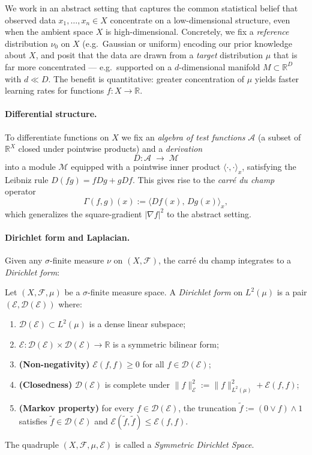 \documentclass{article}
\begin{document}
We work in an abstract setting that captures the common statistical belief
that observed data $x_1,\ldots,x_n \in X$ concentrate on a low-dimensional
structure, even when the ambient space $X$ is high-dimensional.
Concretely, we fix a \emph{reference} distribution $\nu_0$ on $X$
(e.g.\ Gaussian or uniform) encoding our prior knowledge about $X$,
and posit that the data are drawn from a \emph{target} distribution $\mu$
that is far more concentrated — e.g.\ supported on a $d$-dimensional
manifold $M \subset \mathbb{R}^D$ with $d \ll D$.
The benefit is quantitative: greater concentration of $\mu$ yields faster
learning rates for functions $f: X \to \mathbb{R}$.

\paragraph{Differential structure.}
To differentiate functions on $X$ we fix an \emph{algebra of test functions}
$\mathcal{A}$ (a subset of $\mathbb{R}^X$ closed under pointwise products) and a
\emph{derivation}
\[
	D : \mathcal{A} \;\longrightarrow\; \mathcal{M}
\]
into a module $\mathcal{M}$ equipped with a pointwise inner product
$\langle\cdot,\cdot\rangle_x$, satisfying the Leibniz rule
$D(fg) = fDg + gDf$.
This gives rise to the \emph{carré du champ} operator
\[
	\Gamma(f,g)(x) := \langle Df(x),\, Dg(x)\rangle_x,
\]
which generalizes the square-gradient $|\nabla f|^2$ to the abstract setting.

\paragraph{Dirichlet form and Laplacian.}
Given any $\sigma$-finite measure $\nu$ on $(X,\mathcal{F})$, the carré du
champ integrates to a \emph{Dirichlet form}:

\begin{definition}
	Let $(X,\mathcal{F},\mu)$ be a $\sigma$-finite measure space.
	A \emph{Dirichlet form} on $L^2(\mu)$ is a pair
	$(\mathcal{E},\mathcal{D}(\mathcal{E}))$ where:
	\begin{enumerate}
		\item $\mathcal{D}(\mathcal{E})\subset L^2(\mu)$ is a dense linear subspace;
		\item $\mathcal{E}:\mathcal{D}(\mathcal{E})\times\mathcal{D}(\mathcal{E})\to\mathbb{R}$
		      is a symmetric bilinear form;
		\item \textbf{(Non-negativity)} $\mathcal{E}(f,f)\ge 0$ for all
		      $f\in\mathcal{D}(\mathcal{E})$;
		\item \textbf{(Closedness)} $\mathcal{D}(\mathcal{E})$ is complete under
		      $\|f\|_{\mathcal{E}}^2 := \|f\|_{L^2(\mu)}^2 + \mathcal{E}(f,f)$;
		\item \textbf{(Markov property)} for every $f\in\mathcal{D}(\mathcal{E})$,
		      the truncation $\tilde f := (0\vee f)\wedge 1$ satisfies
		      $\tilde f\in\mathcal{D}(\mathcal{E})$ and
		      $\mathcal{E}(\tilde f,\tilde f)\le\mathcal{E}(f,f)$.
	\end{enumerate}
	The quadruple $(X,\mathcal{F},\mu,\mathcal{E})$ is called a
	\emph{Symmetric Dirichlet Space}.
\end{definition}
\end{document}
